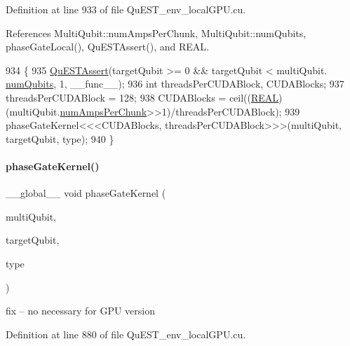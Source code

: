 Definition at line 933 of file Qu\+E\+S\+T\+\_\+env\+\_\+local\+G\+P\+U.\+cu.



References Multi\+Qubit\+::num\+Amps\+Per\+Chunk, Multi\+Qubit\+::num\+Qubits, phase\+Gate\+Local(), Qu\+E\+S\+T\+Assert(), and R\+E\+AL.


\begin{DoxyCode}
934 \{
935     \mbox{\hyperlink{QuEST__env__localGPU_8cu_a3587b9d533e633ccf1abf9ad2ce45d8d}{QuESTAssert}}(targetQubit >= 0 && targetQubit < multiQubit.
      \mbox{\hyperlink{structMultiQubit_ab5b9795bdc6fb5855e1974dcbbaeb36f}{numQubits}}, 1, \_\_func\_\_);
936     \textcolor{keywordtype}{int} threadsPerCUDABlock, CUDABlocks;
937     threadsPerCUDABlock = 128;
938     CUDABlocks = ceil((\mbox{\hyperlink{QuEST__precision_8h_a4b654506f18b8bfd61ad2a29a7e38c25}{REAL}})(multiQubit.\mbox{\hyperlink{structMultiQubit_a1cad83601a78635dd278259c7ed54f18}{numAmpsPerChunk}}>>1)/threadsPerCUDABlock);
939     phaseGateKernel<<<CUDABlocks, threadsPerCUDABlock>>>(multiQubit, targetQubit, type);
940 \}
\end{DoxyCode}
\mbox{\label{QuEST__env__localGPU_8cu_aaf4f43971c469524f45d3bbc6d5f1167}} 
\paragraph{\texorpdfstring{phase\+Gate\+Kernel()}{phaseGateKernel()}}
{\footnotesize\ttfamily \+\_\+\+\_\+global\+\_\+\+\_\+ void phase\+Gate\+Kernel (\begin{DoxyParamCaption}\item[{\mbox{\hyperlink{structMultiQubit}{Multi\+Qubit}}}]{multi\+Qubit,  }\item[{const int}]{target\+Qubit,  }\item[{enum \mbox{\hyperlink{QuEST_8h_a5739021c733cecc49647956b2f7338ea}{phase\+Gate\+Type}}}]{type }\end{DoxyParamCaption})}

fix -- no necessary for G\+PU version 

Definition at line 880 of file Qu\+E\+S\+T\+\_\+env\+\_\+local\+G\+P\+U.\+cu.



